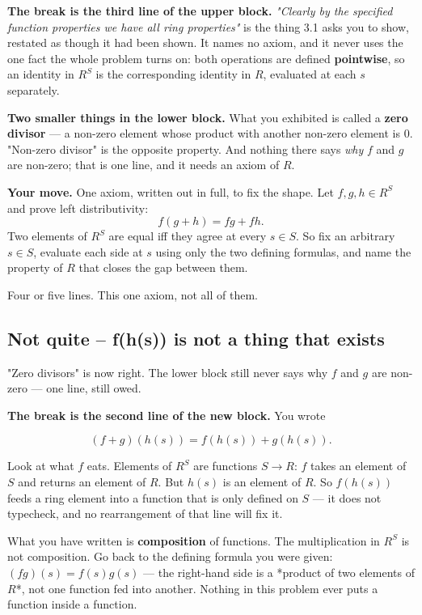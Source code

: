 \documentclass[11pt]{article}
\begin{document}
\textbf{The break is the third line of the upper block.} \emph{"Clearly by the specified function properties we have all ring properties"} is the thing 3.1 asks you to show, restated as though it had been shown. It names no axiom, and it never uses the one fact the whole problem turns on: both operations are defined \textbf{pointwise}, so an identity in $R^S$ is the corresponding identity in $R$, evaluated at each $s$ separately.

\textbf{Two smaller things in the lower block.} What you exhibited is called a \textbf{zero divisor} --- a non-zero element whose product with another non-zero element is $0$. "Non-zero divisor" is the opposite property. And nothing there says \emph{why} $f$ and $g$ are non-zero; that is one line, and it needs an axiom of $R$.

\textbf{Your move.} One axiom, written out in full, to fix the shape. Let $f, g, h \in R^S$ and prove left distributivity:
$$f(g+h) = fg + fh.$$
Two elements of $R^S$ are equal iff they agree at every $s \in S$. So fix an arbitrary $s \in S$, evaluate each side at $s$ using only the two defining formulas, and name the property of $R$ that closes the gap between them.

Four or five lines. This one axiom, not all of them.


\subsection*{Not quite -- f(h(s)) is not a thing that exists}
"Zero divisors" is now right. The lower block still never says why $f$ and $g$ are non-zero --- one line, still owed.

\textbf{The break is the second line of the new block.} You wrote

$$(f+g)(h(s)) = f(h(s)) + g(h(s)).$$

Look at what $f$ eats. Elements of $R^S$ are functions $S \to R$: $f$ takes an element of $S$ and returns an element of $R$. But $h(s)$ is an element of $R$. So $f(h(s))$ feeds a ring element into a function that is only defined on $S$ --- it does not typecheck, and no rearrangement of that line will fix it.

What you have written is \textbf{composition} of functions. The multiplication in $R^S$ is not composition. Go back to the defining formula you were given: $(fg)(s) = f(s)g(s)$ --- the right-hand side is a *product of two elements of $R$*, not one function fed into another. Nothing in this problem ever puts a function inside a function.
\end{document}
